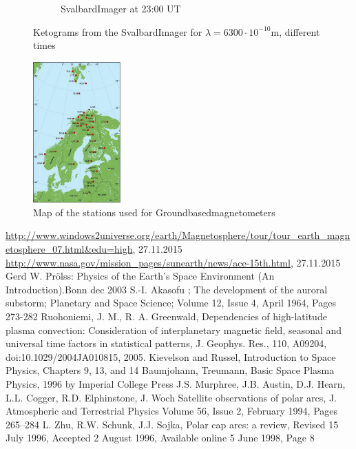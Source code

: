\documentclass[10pt,a4paper]{article}
\begin{document}
\begin{figure}[h]
\begin{subfigure}{0.3\textwidth}
	\caption{ SvalbardImager at 23:00 UT \label{SBI_6_23}}
\end{subfigure}
\caption{Ketograms from the SvalbardImager for $\lambda=6300 \cdot 10^{-10} \mathrm{m}$, different times }
\label{SBI_6_timedevelop}
\end{figure}

\begin{figure}[h]
\centering
\caption{Map of the stations used for Groundbasedmagnetometers}
\label{Groungbasedmagnetometers_maps}
\includegraphics[width=0.3\textwidth]{Stations.jpg}
\end{figure}

\clearpage


\begin{thebibliography}{mustermarke}
 \url{http://www.windows2universe.org/earth/Magnetosphere/tour/tour_earth_magnetosphere_07.html&edu=high}, 27.11.2015
 \url{http://www.nasa.gov/mission_pages/sunearth/news/ace-15th.html}, 27.11.2015
 Gerd W. Prölss: Physics of the Earth's Space Environment (An Introduction).Bonn  dec 2003 
 S.-I. Akasofu ; The development of the auroral substorm; Planetary and Space Science; Volume 12, Issue 4, April 1964, Pages 273-282
 Ruohoniemi, J. M., R. A. Greenwald, Dependencies of high-latitude plasma convection: Consideration of interplanetary magnetic field, seasonal and universal time factors in statistical patterns, J. Geophys.
Res., 110, A09204, doi:10.1029/2004JA010815, 2005.
 Kievelson and Russel, Introduction to Space Physics, Chapters 9, 13, and 14
 Baumjohann, Treumann, Basic Space Plasma Physics, 1996 by Imperial College Press
 J.S. Murphree, J.B. Austin, D.J. Hearn, L.L. Cogger, R.D. Elphinstone, J. Woch Satellite observations of polar arcs, J. Atmospheric and Terrestrial Physics
Volume 56, Issue 2, February 1994, Pages 265–284
     L. Zhu, R.W. Schunk, J.J. Sojka, Polar cap arcs: a review, Revised 15 July 1996, Accepted 2 August 1996, Available online 5 June 1998, Page 8
\end{thebibliography}
\end{document}
